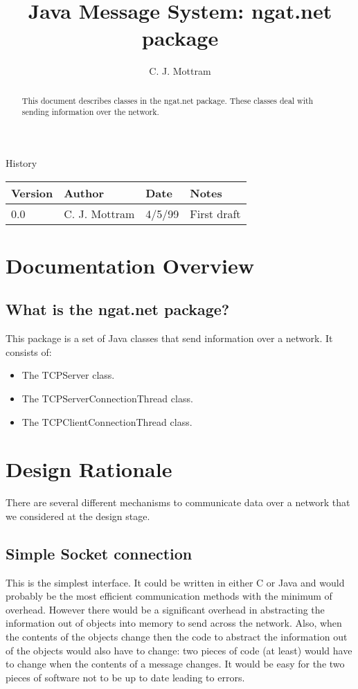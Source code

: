 \documentclass[10pt,a4paper]{article}
\title{Java Message System: ngat.net package}
\author{C. J. Mottram}
\date{}
\begin{document}
\thispagestyle{empty}
\maketitle
\begin{abstract}
This document describes classes in the ngat.net package.
These classes deal with sending information over the network.
\end{abstract}

\centerline{\Large History}
\begin{center}
\begin{tabular}{|l|l|l|p{15em}|}
\hline
{\bf Version} & {\bf Author} & {\bf Date} & {\bf Notes} \\
\hline
0.0 &              C. J. Mottram & 4/5/99 & First draft \\
\hline
\end{tabular}
\end{center}

\newpage
\tableofcontents
\listoffigures
\listoftables
\newpage

\section{Documentation Overview}
\subsection{What is the ngat.net package?}
This package is a set of Java classes that send information over a network.
It consists of:
\begin{itemize}
\item The TCPServer class.
\item The TCPServerConnectionThread class.
\item The TCPClientConnectionThread class.
\end{itemize}

\section{Design Rationale}
There are several different mechanisms to communicate data over a network that we considered at the design stage.

\subsection{Simple Socket connection}
This is the simplest interface. It could be written in either C or Java and would probably be the most efficient 
communication methods with the minimum of overhead. However there would be a significant overhead in abstracting 
the information out of objects into memory to send across the network. 
Also, when the contents of the objects change then the code to abstract the information out of the objects would 
also have to change: two pieces of code (at least) would have to change when the contents of a message changes.
It would be easy for the two pieces of software not to be up to date leading to errors.
\end{document}

